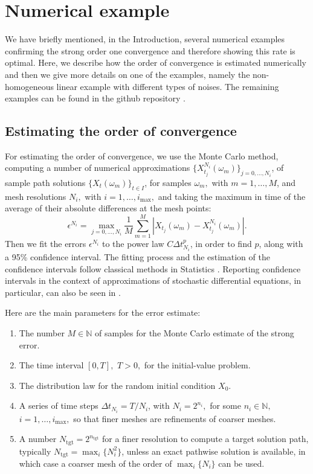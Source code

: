 \documentclass[reqno,12pt]{amsart}
\theoremstyle{plain} %
\theoremstyle{definition} %
\begin{document}
\section{Numerical example}
\label{secnumex}

We have briefly mentioned, in the Introduction, several numerical examples confirming the strong order one convergence and therefore showing this rate is optimal. Here, we describe how the order of convergence is estimated numerically and then we give more details on one of the examples, namely the non-homogeneous linear example with different types of noises. The remaining examples can be found in the github repository \cite{RODEConvEM2023}.

\subsection{Estimating the order of convergence}
\label{secconvergence}

For estimating the order of convergence, we use the Monte Carlo method, computing a number of numerical approximations $\{X_{t_j}^{N_i}(\omega_m)\}_{j=0, \ldots, N_i}$, of sample path solutions $\{X_t(\omega_m)\}_{t\in I}$, for samples $\omega_m,$ with $m = 1, \ldots, M$, and mesh resolutions $N_i,$ with $i=1, \ldots, i_{\max},$ and taking the maximum in time of the average of their absolute differences at the mesh points:
\begin{equation}
    \epsilon^{N_i} = \max_{j=0, \ldots, N_i} \frac{1}{M}\sum_{m=1}^M \left|X_{t_j}(\omega_m) - X_{t_j}^{N_i}(\omega_m)\right|.
\end{equation}
Then we fit the errors $\epsilon^{N_i}$ to the power law $C\Delta t_{N_i}^p$, in order to find $p$, along with a 95\% confidence interval. The fitting process and the estimation of the confidence intervals follow classical methods in Statistics \cite{DeGrootSchervish2018,HastieTibshiraniFriedman2009,JamesWittenHastieTibshirani2021,JohnsonWichern2007}. Reporting confidence intervals in the context of approximations of stochastic differential equations, in particular, can also be seen in \cite{KloedenPlatenSchurz2012}.

Here are the main parameters for the error estimate:
\begin{enumerate}
    \item The number $M\in\mathbb{N}$ of samples for the Monte Carlo estimate of the strong error.
    \item The time interval $[0, T], $ $T > 0,$ for the initial-value problem.
    \item The distribution law for the random initial condition $X_0$.
    \item A series of time steps $\Delta t_{N_i} = T/N_i$, with $N_i=2^{n_i},$ for some $n_i\in\mathbb{N},$ $i=1, \ldots, i_{\max},$ so that finer meshes are refinements of coarser meshes.
    \item A number $N_{\mathrm{tgt}}=2^{n_\mathrm{tgt}}$ for a finer resolution to compute a target solution path, typically $N_{\mathrm{tgt}} = \max_i\{N_i^2\}$, unless an exact pathwise solution is available, in which case a coarser mesh of the order of $\max_i\{N_i\}$ can be used.
\end{enumerate}
\end{document}
